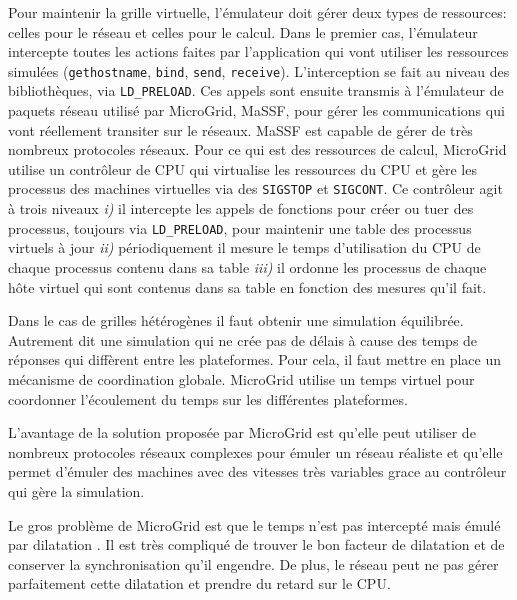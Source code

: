 Pour maintenir la grille virtuelle, l'émulateur doit gérer deux types de ressources: celles pour le réseau et celles pour le calcul. Dans le premier cas, l'émulateur intercepte toutes les actions faites par l'application qui vont utiliser les ressources simulées (\texttt{gethostname}, \texttt{bind}, \texttt{send}, \texttt{receive}). L'interception se fait au niveau des bibliothèques, via \texttt{LD\_PRELOAD}. Ces appels sont ensuite transmis à l'émulateur de paquets réseau utilisé par MicroGrid, MaSSF, pour gérer les communications qui vont réellement transiter sur le réseaux. MaSSF est capable de gérer de très nombreux protocoles réseaux.  Pour ce qui est des ressources de calcul, MicroGrid utilise un contrôleur de CPU qui virtualise les ressources du CPU et gère les processus des machines virtuelles via des \texttt{SIGSTOP} et \texttt{SIGCONT}. Ce contrôleur agit à trois niveaux \textit{i)} il intercepte les appels de fonctions pour créer ou tuer des processus, toujours via \texttt{LD\_PRELOAD}, pour maintenir une table des processus virtuels à jour \textit{ii)} périodiquement il mesure le temps d'utilisation du CPU de chaque processus contenu dans sa table \textit{iii)} il ordonne les processus de chaque hôte virtuel qui sont contenus dans sa table en fonction des mesures qu'il fait.

Dans le cas de grilles hétérogènes il faut obtenir une simulation équilibrée. Autrement dit une simulation qui ne crée pas de délais à cause des temps de réponses qui diffèrent entre les plateformes. Pour cela, il faut mettre en place un mécanisme de coordination globale. MicroGrid utilise un temps virtuel pour coordonner l'écoulement du temps sur les différentes plateformes.

L'avantage de la solution proposée par MicroGrid est qu'elle peut utiliser de nombreux protocoles réseaux complexes pour émuler un réseau réaliste et qu'elle permet d'émuler des machines avec des vitesses très variables grace au contrôleur qui gère la simulation.

Le gros problème de MicroGrid est que le temps n'est pas intercepté mais émulé par dilatation \citep{MICROGRID_lee2014integrated}. Il est très compliqué de trouver le bon facteur de dilatation et de conserver la synchronisation qu'il engendre. De plus, le réseau peut ne pas gérer parfaitement cette dilatation et prendre du retard sur le CPU.

